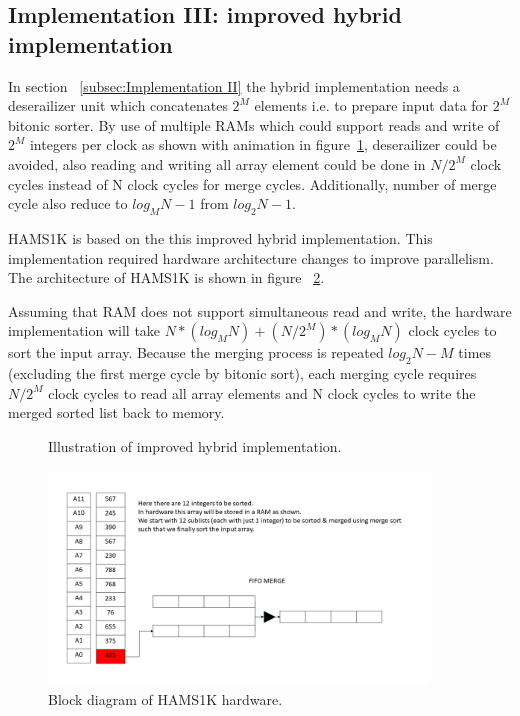 \documentclass{article}
\begin{document}
\subsection{Implementation III: improved hybrid implementation}
\label{subsec:Implementation III}

In section ~\ref{subsec:Implementation II} the hybrid implementation needs a deserailizer unit which concatenates $2^M$ elements i.e. to prepare input data for $2^M$ bitonic sorter. By use of multiple RAMs which could support reads and write of $2^M$ integers per clock as shown with animation in figure~\ref{fig:impl3}, deserailizer could be avoided, also reading and writing all array element could be done in $N/2^M$ clock cycles instead of N clock cycles for merge cycles. Additionally, number of merge cycle also reduce to $log_MN-1$ from $log_2N-1$.

HAMS1K is based on the this improved hybrid implementation. This implementation required hardware architecture changes to improve parallelism. The architecture of HAMS1K is shown in figure ~\ref{fig:scheme}.

Assuming that RAM does not support simultaneous read and write, the hardware implementation will take $N*(log_MN)+(N/2^M)*(log_MN)$ clock cycles to sort the input array. Because the merging process is repeated $log_2N-M$ times (excluding the first merge cycle by bitonic sort), each merging cycle requires $N/2^M$ clock cycles to read all array elements and N clock cycles to write the merged sorted list back to memory.
\begin{figure}[H]
\centering
\caption{\label{fig:impl3}Illustration of improved hybrid implementation.}
\end{figure}

\begin{figure}[H]
\centering
\includegraphics[width=0.90\textwidth]{hams_scheme.png}
\caption{\label{fig:scheme}Block diagram of HAMS1K hardware.}
\end{figure}
\end{document}
